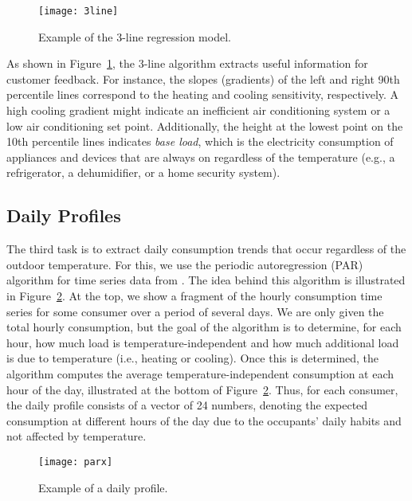 \documentclass[prodmode,acmtods]{acmsmall}
\begin{document}
\begin{figure}[t]
  \centering
 \texttt{[image: 3line]}
 \vspace{-80pt}
  \caption{Example of the 3-line regression model.}
  \label{fig:3line}
\end{figure}

As shown in Figure~\ref{fig:3line}, the 3-line algorithm extracts useful information for customer feedback.  For instance, the slopes (gradients) of the left and right 90th percentile lines correspond to the heating and cooling sensitivity, respectively.  A high cooling gradient might indicate an inefficient air conditioning system or a low air conditioning set point.  Additionally, the height at the lowest point on the 10th percentile lines indicates \emph{base load}, which is the electricity consumption of appliances and devices that are always on regardless of the temperature (e.g., a refrigerator, a dehumidifier, or a home security system). 

\subsection{Daily Profiles} \label{sec:parx}

The third task is to extract daily consumption trends that occur regardless of the outdoor temperature.  For this, we use the periodic autoregression (PAR) algorithm for time series data from \cite{omid,espinoza}.  The idea behind this algorithm is illustrated in Figure~\ref{fig:parx}.  At the top, we show a fragment of the hourly consumption time series for some consumer over a period of several days.  We are only given the total hourly consumption, but the goal of the algorithm is to determine, for each hour, how much load is temperature-independent and how much additional load is due to temperature (i.e., heating or cooling).  Once this is determined, the algorithm computes the average temperature-independent consumption at each hour of the day, illustrated at the bottom of Figure~\ref{fig:parx}.  Thus, for each consumer, the daily profile consists of a vector of 24 numbers, denoting the expected consumption at different hours of the day due to the occupants' daily habits and not affected by temperature.

\begin{figure}[t]
  \centering
 \texttt{[image: parx]}
 \vspace{-10pt}
  \caption{Example of a daily profile.}
  \label{fig:parx} 
\end{figure}
\end{document}
